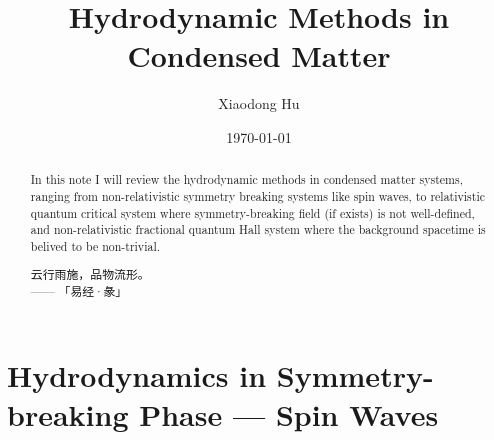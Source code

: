 \documentclass[10pt,nofootinbib,letterpaper]{revtex4}
\begin{document}
\title{Hydrodynamic Methods in Condensed Matter}
\author{Xiaodong Hu}

\date{\today}

\begin{abstract}
	In this note I will review the hydrodynamic methods in condensed matter systems, ranging from non-relativistic symmetry breaking systems like spin waves, to relativistic quantum critical system where symmetry-breaking field (if exists) is not well-defined, and non-relativistic fractional quantum Hall system where the background spacetime is belived to be non-trivial.\par
		\hfill\par
		{\centering\kaishu 云行雨施，品物流形。\\[0.5em]}
	\hfill------ 「易经·彖」
\end{abstract}

\maketitle
\tableofcontents

\section{Hydrodynamics in Symmetry-breaking Phase --- Spin Waves}
\end{document}
